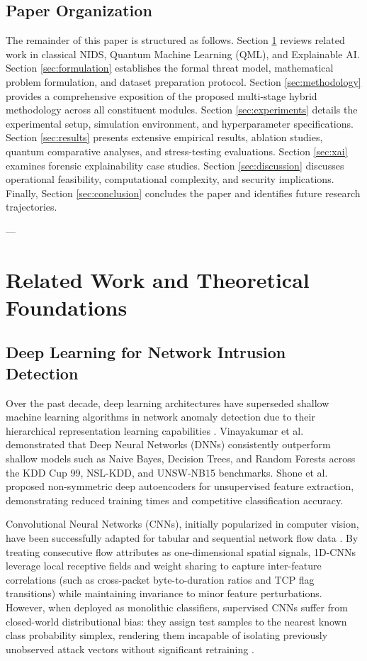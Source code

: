 \documentclass[preprint,12pt]{elsarticle}
\begin{document}
\subsection{Paper Organization}
The remainder of this paper is structured as follows. Section \ref{sec:related} reviews related work in classical NIDS, Quantum Machine Learning (QML), and Explainable AI. Section \ref{sec:formulation} establishes the formal threat model, mathematical problem formulation, and dataset preparation protocol. Section \ref{sec:methodology} provides a comprehensive exposition of the proposed multi-stage hybrid methodology across all constituent modules. Section \ref{sec:experiments} details the experimental setup, simulation environment, and hyperparameter specifications. Section \ref{sec:results} presents extensive empirical results, ablation studies, quantum comparative analyses, and stress-testing evaluations. Section \ref{sec:xai} examines forensic explainability case studies. Section \ref{sec:discussion} discusses operational feasibility, computational complexity, and security implications. Finally, Section \ref{sec:conclusion} concludes the paper and identifies future research trajectories.

---

\section{Related Work and Theoretical Foundations}
\label{sec:related}

\subsection{Deep Learning for Network Intrusion Detection}
Over the past decade, deep learning architectures have superseded shallow machine learning algorithms in network anomaly detection due to their hierarchical representation learning capabilities \cite{al2018intrusion, khraisat2019survey}. Vinayakumar et al. \cite{vinayakumar2019deep} demonstrated that Deep Neural Networks (DNNs) consistently outperform shallow models such as Naive Bayes, Decision Trees, and Random Forests across the KDD Cup 99, NSL-KDD, and UNSW-NB15 benchmarks. Shone et al. \cite{shone2018deep} proposed non-symmetric deep autoencoders for unsupervised feature extraction, demonstrating reduced training times and competitive classification accuracy.

Convolutional Neural Networks (CNNs), initially popularized in computer vision, have been successfully adapted for tabular and sequential network flow data \cite{wang2017malware}. By treating consecutive flow attributes as one-dimensional spatial signals, 1D-CNNs leverage local receptive fields and weight sharing to capture inter-feature correlations (such as cross-packet byte-to-duration ratios and TCP flag transitions) while maintaining invariance to minor feature perturbations. However, when deployed as monolithic classifiers, supervised CNNs suffer from closed-world distributional bias: they assign test samples to the nearest known class probability simplex, rendering them incapable of isolating previously unobserved attack vectors without significant retraining \cite{bendale2016towards}.
\end{document}
